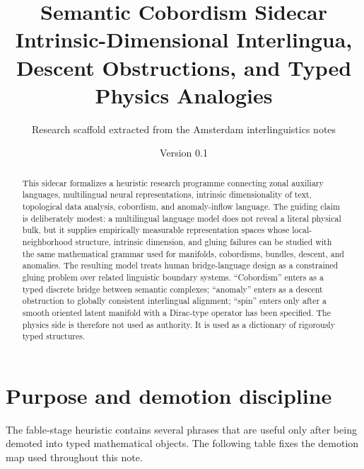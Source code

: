 \documentclass[11pt]{article}
\title{\textbf{Semantic Cobordism Sidecar}\\[0.4em]
  Intrinsic-Dimensional Interlingua, Descent Obstructions, and Typed Physics Analogies}
\author{Research scaffold extracted from the Amsterdam interlinguistics notes}
\date{Version 0.1}
\begin{document}
\maketitle

\begin{abstract}
This sidecar formalizes a heuristic research programme connecting zonal auxiliary languages, multilingual neural representations, intrinsic dimensionality of text, topological data analysis, cobordism, and anomaly-inflow language.  The guiding claim is deliberately modest: a multilingual language model does not reveal a literal physical bulk, but it supplies empirically measurable representation spaces whose local-neighborhood structure, intrinsic dimension, and gluing failures can be studied with the same mathematical grammar used for manifolds, cobordisms, bundles, descent, and anomalies.  The resulting model treats human bridge-language design as a constrained gluing problem over related linguistic boundary systems.  ``Cobordism'' enters as a typed discrete bridge between semantic complexes; ``anomaly'' enters as a descent obstruction to globally consistent interlingual alignment; ``spin'' enters only after a smooth oriented latent manifold with a Dirac-type operator has been specified.  The physics side is therefore not used as authority.  It is used as a dictionary of rigorously typed structures.
\end{abstract}

\tableofcontents

\section{Purpose and demotion discipline}

The fable-stage heuristic contains several phrases that are useful only after being demoted into typed mathematical objects.  The following table fixes the demotion map used throughout this note.
\end{document}

